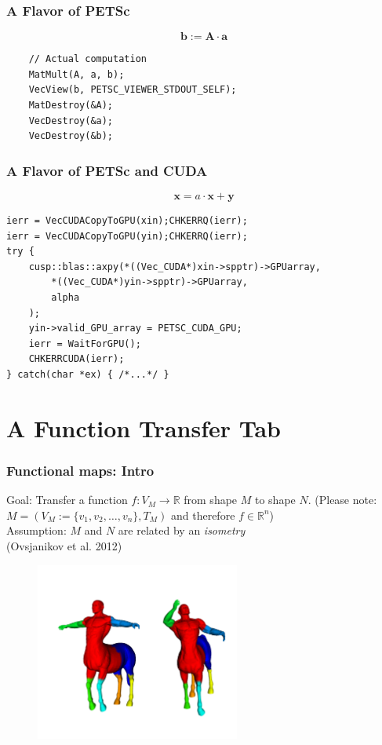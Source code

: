 \documentclass[compress]{beamer}
\begin{document}
\begin{frame}[fragile]
\frametitle{A Flavor of PETSc}
$$
	\mathbf{b} := \mathbf{A} \cdot \mathbf{a}
$$
\begin{lstlisting}
    // Actual computation
    MatMult(A, a, b);
    VecView(b, PETSC_VIEWER_STDOUT_SELF);
    MatDestroy(&A);
    VecDestroy(&a);
    VecDestroy(&b);
\end{lstlisting}

\end{frame}

\begin{frame}[fragile]
\frametitle{A Flavor of PETSc and CUDA}
$$
	\mathbf{x} = a \cdot \mathbf{x} + \mathbf{y}
$$
\begin{lstlisting}
ierr = VecCUDACopyToGPU(xin);CHKERRQ(ierr);
ierr = VecCUDACopyToGPU(yin);CHKERRQ(ierr);
try {
    cusp::blas::axpy(*((Vec_CUDA*)xin->spptr)->GPUarray,
        *((Vec_CUDA*)yin->spptr)->GPUarray,
        alpha
    );
    yin->valid_GPU_array = PETSC_CUDA_GPU;
    ierr = WaitForGPU();
    CHKERRCUDA(ierr);
} catch(char *ex) { /*...*/ }
\end{lstlisting}

\end{frame}

\section{A Function Transfer Tab}

\begin{frame}
\frametitle{Functional maps: Intro}
Goal: Transfer a function $f:V_M \to \mathbb{R}$ from shape $M$ to shape $N$. (Please note: $M = (V_M:=\{v_1, v_2, \dots, v_n\}, T_M)$ and therefore $f \in \mathbb{R}^n$)\\
Assumption: $M$ and $N$ are related by an \emph{isometry} \\
(Ovsjanikov et al. 2012)
  \begin{figure}[h]
	\centering
	\includegraphics[width=0.6\textwidth]{fm.pdf}
\end{figure}
\end{frame}
\end{document}

